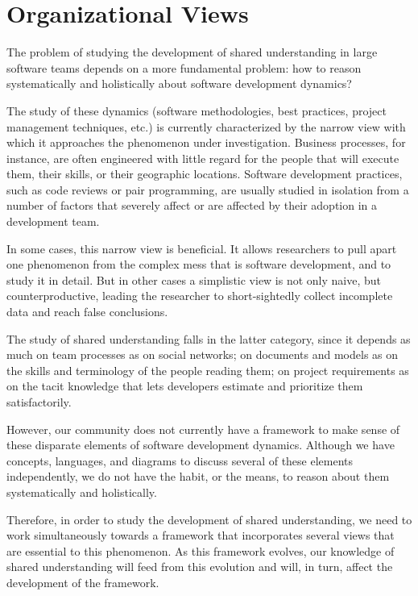 \section{Organizational Views}

The problem of studying the development of shared understanding in large software teams depends on a more fundamental problem: how to reason systematically and holistically about software development dynamics?

The study of these dynamics (software methodologies, best practices, project management techniques, etc.) is currently characterized by the narrow view with which it approaches the phenomenon under investigation. Business processes, for instance, are often engineered with little regard for the people that will execute them, their skills, or their geographic locations. Software development practices, such as code reviews or pair programming, are usually studied in isolation from a number of factors that severely affect or are affected by their adoption in a development team.

In some cases, this narrow view is beneficial. It allows researchers to pull apart one phenomenon from the complex mess that is software development, and to study it in detail. But in other cases a simplistic view is not only naive, but counterproductive, leading the researcher to short-sightedly collect incomplete data and reach false conclusions.

The study of shared understanding falls in the latter category, since it depends as much on team processes as on social networks; on documents and models as on the skills and terminology of the people reading them; on project requirements as on the tacit knowledge that lets developers estimate and prioritize them satisfactorily.

However, our community does not currently have a framework to make sense of these disparate elements of software development dynamics. Although we have concepts, languages, and diagrams to discuss several of these elements independently, we do not have the habit, or the means, to reason about them systematically and holistically.

Therefore, in order to study the development of shared understanding, we need to work simultaneously towards a framework that incorporates several views that are essential to this phenomenon. As this framework evolves, our knowledge of shared understanding will feed from this evolution and will, in turn, affect the development of the framework.

